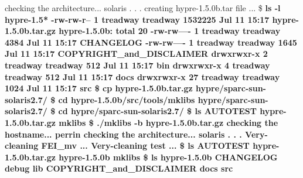 \begin{ttfamily}
checking the architecture... solaris\linebreak
 . . .\linebreak
creating hypre-1.5.0b.tar file ...\linebreak
\$ \bfseries{ls -l hypre-1.5*}\linebreak
-rw-rw-r--   1 treadway treadway 1532225 Jul 11 15:17 hypre-1.5.0b.tar.gz\linebreak
\linebreak
hypre-1.5.0b:\linebreak
total 20\linebreak
-rw-rw----   1 treadway treadway    4384 Jul 11 15:17 CHANGELOG\linebreak
-rw-rw----   1 treadway treadway    1645 Jul 11 15:17 COPYRIGHT\_and\_DISCLAIMER\linebreak
drwxrwxr-x   2 treadway treadway     512 Jul 11 15:17 bin\linebreak
drwxrwxr-x   4 treadway treadway     512 Jul 11 15:17 docs\linebreak
drwxrwxr-x  27 treadway treadway    1024 Jul 11 15:17 src\linebreak
\$ \bfseries{cp hypre-1.5.0b.tar.gz hypre/sparc-sun-solaris2.7/}\linebreak
\$ \bfseries{cd hypre-1.5.0b/src/tools/mklibs hypre/sparc-sun-solaris2.7/}\linebreak
\$ \bfseries{cd hypre/sparc-sun-solaris2.7/}\linebreak
\$ \bfseries{ls}\linebreak
AUTOTEST             hypre-1.5.0b.tar.gz  mklibs\linebreak
\$ \bfseries{./mklibs -b hypre-1.5.0b.tar.gz}\linebreak
checking the hostname... perrin\linebreak
checking the architecture... solaris\linebreak
 . . .\linebreak
Very-cleaning FEI\_mv ...\linebreak
Very-cleaning test ...\linebreak
\$ \bfseries{ls}\linebreak
AUTOTEST             hypre-1.5.0b.tar.gz\linebreak
hypre-1.5.0b         mklibs\linebreak
\$ \bfseries{ls hypre-1.5.0b}\linebreak
CHANGELOG                 debug                     lib\linebreak
COPYRIGHT\_and\_DISCLAIMER  docs                      src\linebreak

\end{ttfamily}
